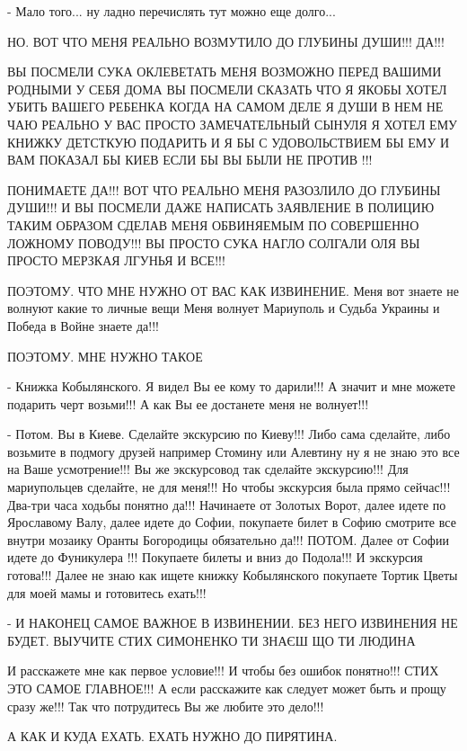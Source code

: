 - Мало того... ну ладно перечислять тут можно еще долго...

НО. ВОТ ЧТО МЕНЯ РЕАЛЬНО ВОЗМУТИЛО ДО ГЛУБИНЫ ДУШИ!!! ДА!!!

ВЫ ПОСМЕЛИ СУКА ОКЛЕВЕТАТЬ МЕНЯ ВОЗМОЖНО ПЕРЕД ВАШИМИ РОДНЫМИ У СЕБЯ ДОМА
ВЫ ПОСМЕЛИ СКАЗАТЬ ЧТО Я ЯКОБЫ ХОТЕЛ УБИТЬ ВАШЕГО РЕБЕНКА КОГДА НА САМОМ ДЕЛЕ Я ДУШИ В НЕМ НЕ ЧАЮ
РЕАЛЬНО У ВАС ПРОСТО ЗАМЕЧАТЕЛЬНЫЙ СЫНУЛЯ Я ХОТЕЛ ЕМУ КНИЖКУ ДЕТСТКУЮ ПОДАРИТЬ И Я БЫ С УДОВОЛЬСТВИЕМ
БЫ ЕМУ И ВАМ ПОКАЗАЛ БЫ КИЕВ ЕСЛИ БЫ ВЫ БЫЛИ НЕ ПРОТИВ !!!

ПОНИМАЕТЕ ДА!!! ВОТ ЧТО РЕАЛЬНО МЕНЯ РАЗОЗЛИЛО ДО ГЛУБИНЫ ДУШИ!!!
И ВЫ ПОСМЕЛИ ДАЖЕ НАПИСАТЬ ЗАЯВЛЕНИЕ В ПОЛИЦИЮ ТАКИМ ОБРАЗОМ СДЕЛАВ МЕНЯ ОБВИНЯЕМЫМ ПО СОВЕРШЕННО
ЛОЖНОМУ ПОВОДУ!!! ВЫ ПРОСТО СУКА НАГЛО СОЛГАЛИ ОЛЯ ВЫ ПРОСТО МЕРЗКАЯ ЛГУНЬЯ И ВСЕ!!!

ПОЭТОМУ. ЧТО МНЕ НУЖНО ОТ ВАС КАК ИЗВИНЕНИЕ. Меня вот знаете не волнуют какие то личные вещи
Меня волнует Мариуполь и Судьба Украины и Победа в Войне знаете да!!! 

ПОЭТОМУ. МНЕ НУЖНО ТАКОЕ

- Книжка Кобылянского. Я видел Вы ее кому то дарили!!! А значит и мне можете подарить черт возьми!!!
А как Вы ее достанете меня не волнует!!!

- Потом. Вы в Киеве. Сделайте экскурсию по Киеву!!! Либо сама сделайте, либо
возьмите в подмогу друзей например Стомину или Алевтину ну я не знаю это все на Ваше усмотрение!!!
Вы же экскурсовод так сделайте экскурсию!!! Для
мариупольцев сделайте, не для меня!!! Но чтобы экскурсия была прямо сейчас!!!
Два-три часа ходьбы понятно да!!!  Начинаете от Золотых Ворот, далее идете по
Ярославому Валу, далее идете до Софии, покупаете билет в Софию смотрите все
внутри мозаику Оранты Богородицы обязательно да!!! ПОТОМ. Далее от Софии идете
до Фуникулера !!! Покупаете билеты и вниз до Подола!!!  И экскурсия готова!!!
Далее не знаю как ищете книжку Кобылянского покупаете Тортик Цветы для моей мамы и
готовитесь ехать!!!

- И НАКОНЕЦ САМОЕ ВАЖНОЕ В ИЗВИНЕНИИ. БЕЗ НЕГО ИЗВИНЕНИЯ НЕ БУДЕТ. ВЫУЧИТЕ СТИХ
СИМОНЕНКО ТИ ЗНАЄШ ЩО ТИ ЛЮДИНА

И расскажете мне как первое условие!!! И чтобы без ошибок понятно!!! СТИХ ЭТО САМОЕ ГЛАВНОЕ!!!
А если расскажите как следует может быть и прощу сразу же!!! Так что потрудитесь 
Вы же любите это дело!!!

А КАК И КУДА ЕХАТЬ. ЕХАТЬ НУЖНО ДО ПИРЯТИНА.

